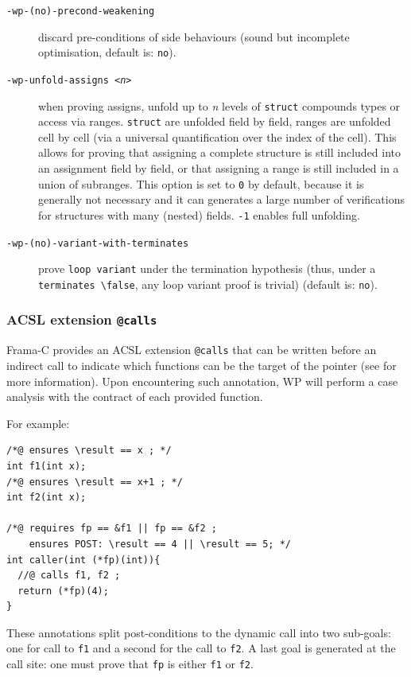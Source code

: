 \begin{description}
\item[\tt -wp-(no)-precond-weakening] discard pre-conditions of side behaviours (sound but
  incomplete optimisation, default is: \texttt{no}).
\item[\tt -wp-unfold-assigns <{\it n}>] when proving assigns, unfold up to
  \textit{n} levels of \texttt{struct} compounds types or access via ranges.
  \texttt{struct} are unfolded field by field, ranges are unfolded cell by
  cell (via a universal quantification over the index of the cell).
  This allows for proving that assigning a complete structure is still included
  into an assignment field by field, or that assigning a range is still included
  in a union of subranges. This option is set to \texttt{0} by default, because
  it is generally not necessary and it can generates a large number of
  verifications for structures with many (nested) fields. \texttt{-1} enables
  full unfolding.
\item[\tt -wp-(no)-variant-with-terminates] prove \texttt{loop variant} under
  the termination hypothesis (thus, under a
  \texttt{terminates \textbackslash{}false}, any loop variant proof is trivial)
  (default is: \texttt{no}).
\end{description}

\subsubsection{ACSL extension \texttt{@calls}}
\label{acsl:calls}

Frama-C provides an ACSL extension \texttt{@calls} that can be written
before an indirect call to indicate which functions can be the target
of the pointer (see \cite{userman} for more information). Upon encountering
such annotation, WP will perform a case analysis with the contract of
each provided function.

For example:

\begin{lstlisting}[style=c]
/*@ ensures \result == x ; */
int f1(int x);
/*@ ensures \result == x+1 ; */
int f2(int x);

/*@ requires fp == &f1 || fp == &f2 ;
    ensures POST: \result == 4 || \result == 5; */
int caller(int (*fp)(int)){
  //@ calls f1, f2 ;
  return (*fp)(4);
}
\end{lstlisting}

These annotations split post-conditions to the dynamic call into two sub-goals: one for call to \verb+f1+ and
a second for the call to \verb+f2+. A last goal is generated at the call
site: one must prove that \verb+fp+ is either \verb+f1+ or \verb+f2+.

